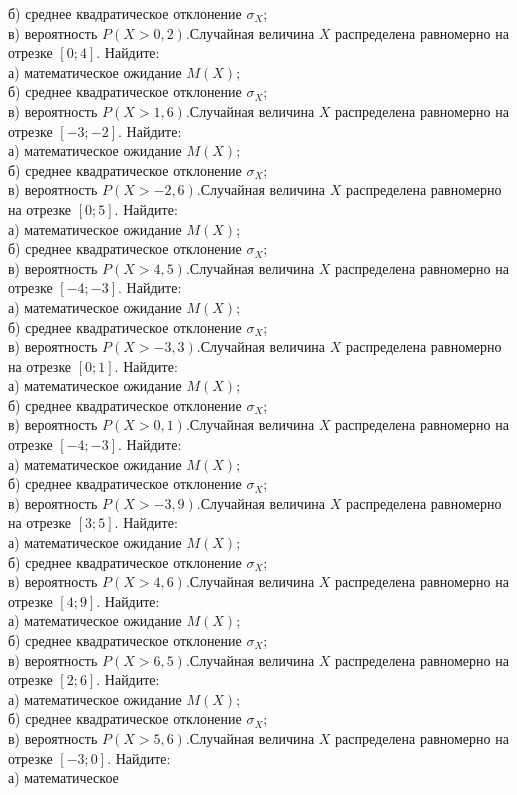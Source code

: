 б) среднее квадратическое отклонение $\sigma_X$; \\ \quad в) вероятность $P(X>0{,}2)$.Случайная величина $X$ распределена равномерно на отрезке $[0; 4]$. Найдите: \\ \quad а) математическое ожидание $M(X)$; \\ \quad б) среднее квадратическое отклонение $\sigma_X$; \\ \quad в) вероятность $P(X>1{,}6)$.Случайная величина $X$ распределена равномерно на отрезке $[-3; -2]$. Найдите: \\ \quad а) математическое ожидание $M(X)$; \\ \quad б) среднее квадратическое отклонение $\sigma_X$; \\ \quad в) вероятность $P(X>-2{,}6)$.Случайная величина $X$ распределена равномерно на отрезке $[0; 5]$. Найдите: \\ \quad а) математическое ожидание $M(X)$; \\ \quad б) среднее квадратическое отклонение $\sigma_X$; \\ \quad в) вероятность $P(X>4{,}5)$.Случайная величина $X$ распределена равномерно на отрезке $[-4; -3]$. Найдите: \\ \quad а) математическое ожидание $M(X)$; \\ \quad б) среднее квадратическое отклонение $\sigma_X$; \\ \quad в) вероятность $P(X>-3{,}3)$.Случайная величина $X$ распределена равномерно на отрезке $[0; 1]$. Найдите: \\ \quad а) математическое ожидание $M(X)$; \\ \quad б) среднее квадратическое отклонение $\sigma_X$; \\ \quad в) вероятность $P(X>0{,}1)$.Случайная величина $X$ распределена равномерно на отрезке $[-4; -3]$. Найдите: \\ \quad а) математическое ожидание $M(X)$; \\ \quad б) среднее квадратическое отклонение $\sigma_X$; \\ \quad в) вероятность $P(X>-3{,}9)$.Случайная величина $X$ распределена равномерно на отрезке $[3; 5]$. Найдите: \\ \quad а) математическое ожидание $M(X)$; \\ \quad б) среднее квадратическое отклонение $\sigma_X$; \\ \quad в) вероятность $P(X>4{,}6)$.Случайная величина $X$ распределена равномерно на отрезке $[4; 9]$. Найдите: \\ \quad а) математическое ожидание $M(X)$; \\ \quad б) среднее квадратическое отклонение $\sigma_X$; \\ \quad в) вероятность $P(X>6{,}5)$.Случайная величина $X$ распределена равномерно на отрезке $[2; 6]$. Найдите: \\ \quad а) математическое ожидание $M(X)$; \\ \quad б) среднее квадратическое отклонение $\sigma_X$; \\ \quad в) вероятность $P(X>5{,}6)$.Случайная величина $X$ распределена равномерно на отрезке $[-3; 0]$. Найдите: \\ \quad а) математическое 